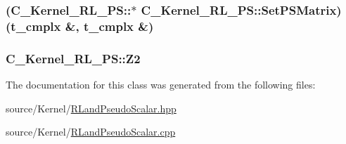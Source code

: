 \hypertarget{class_c___kernel___r_l___p_s_adf4728ca0caa741eb5242e4c8b67ef44}{
\subsubsection[{Set\-P\-S\-Matrix}]{(C\-\_\-\-Kernel\-\_\-\-R\-L\-\_\-\-P\-S\-::$\ast$ C\-\_\-\-Kernel\-\_\-\-R\-L\-\_\-\-P\-S\-::\-Set\-P\-S\-Matrix)({\bf t\-\_\-cmplx} \&, {\bf t\-\_\-cmplx} \&)\hspace{0.3cm}{\ttfamily [protected]}}}\label{class_c___kernel___r_l___p_s_adf4728ca0caa741eb5242e4c8b67ef44}
\hypertarget{class_c___kernel___r_l___p_s_a737ca2c158cc24d99d183314cd4ef248}{
\subsubsection[{Z2}]{ C\-\_\-\-Kernel\-\_\-\-R\-L\-\_\-\-P\-S\-::\-Z2\hspace{0.3cm}{\ttfamily [protected]}}}\label{class_c___kernel___r_l___p_s_a737ca2c158cc24d99d183314cd4ef248}


The documentation for this class was generated from the following files\-:\begin{DoxyCompactItemize}
\item 
source/\-Kernel/\hyperlink{_r_land_pseudo_scalar_8hpp}{R\-Land\-Pseudo\-Scalar.\-hpp}\item 
source/\-Kernel/\hyperlink{_r_land_pseudo_scalar_8cpp}{R\-Land\-Pseudo\-Scalar.\-cpp}\end{DoxyCompactItemize}
